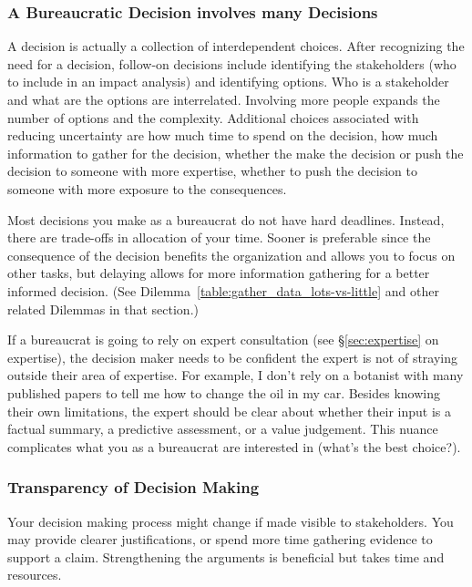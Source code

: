 

\subsubsection{A Bureaucratic Decision involves many Decisions}

A decision is actually a collection of interdependent choices. After recognizing the need for a decision, follow-on decisions include identifying the stakeholders (who to include in an impact analysis) and identifying options. Who is a stakeholder and what are the options are interrelated. Involving more people expands the number of options and the complexity. Additional choices associated with reducing uncertainty are how much time to spend on the decision, how much information to gather for the decision, whether the make the decision or push the decision to someone with more expertise, whether to push the decision to someone with more exposure to the consequences.

Most decisions you make as a bureaucrat do not have hard deadlines. Instead, there are trade-offs in allocation of your time. Sooner is preferable since the consequence of the decision benefits the organization and allows you to focus on other tasks, but delaying allows for more information gathering for a better informed decision. (See Dilemma~\ref{table:gather_data_lots-vs-little} and other related Dilemmas in that section.)


If a bureaucrat is going to rely on expert consultation (see \S\ref{sec:expertise} on expertise), the decision maker needs to be confident the expert is not of straying outside their area of expertise. For example, I don't rely on a botanist with many published papers to tell me how to change the oil in my car. 
Besides knowing their own limitations, the expert should be clear about whether their input is a factual summary, a predictive assessment, or a value judgement. This nuance complicates what you as a bureaucrat are interested in (what's the best choice?).


\subsubsection{Transparency of Decision Making\label{sec:transparency-of-decisions}}

Your decision making process might change if made visible to stakeholders. You may provide clearer justifications, or spend more time gathering evidence to support a claim. Strengthening the arguments is beneficial but takes time and resources. 

